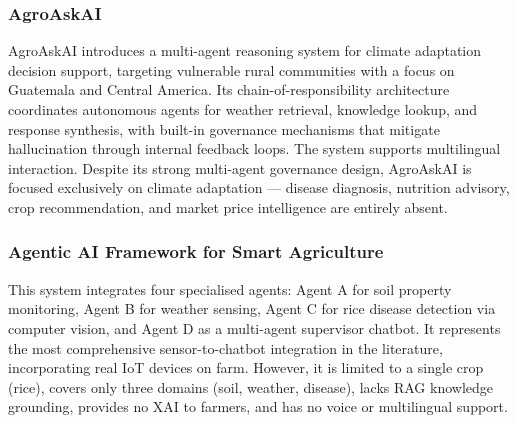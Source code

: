 \documentclass[12pt,a4paper]{article}
\begin{document}
\subsubsection{AgroAskAI \cite{agroaskai2024}}
AgroAskAI introduces a multi-agent reasoning system for climate adaptation decision support, targeting vulnerable rural communities with a focus on Guatemala and Central America. Its chain-of-responsibility architecture coordinates autonomous agents for weather retrieval, knowledge lookup, and response synthesis, with built-in governance mechanisms that mitigate hallucination through internal feedback loops. The system supports multilingual interaction. Despite its strong multi-agent governance design, AgroAskAI is focused exclusively on climate adaptation --- disease diagnosis, nutrition advisory, crop recommendation, and market price intelligence are entirely absent.

\subsubsection{Agentic AI Framework for Smart Agriculture \cite{agenticmdpi2026}}
This system integrates four specialised agents: Agent A for soil property monitoring, Agent B for weather sensing, Agent C for rice disease detection via computer vision, and Agent D as a multi-agent supervisor chatbot. It represents the most comprehensive sensor-to-chatbot integration in the literature, incorporating real IoT devices on farm. However, it is limited to a single crop (rice), covers only three domains (soil, weather, disease), lacks RAG knowledge grounding, provides no XAI to farmers, and has no voice or multilingual support.
\end{document}
